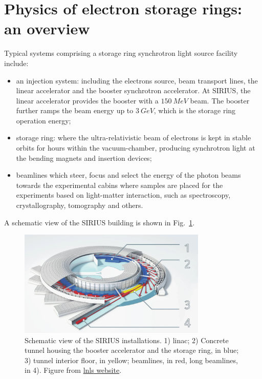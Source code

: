 \section*{Physics of electron storage rings: an overview}

Typical systems comprising a storage ring synchrotron light source facility include:
\begin{itemize}
    \item an injection system: including the electrons source, beam transport lines, the linear accelerator and the booster synchrotron accelerator. At SIRIUS, the linear accelerator provides the booster with a $150~\unit{MeV}$ beam. The booster further ramps the beam energy up to $3~\unit{GeV}$, which is the storage ring operation energy;
    \item storage ring: where the ultra-relativistic beam of electrons is kept in stable orbits for hours within the vacuum-chamber, producing synchrotron light at the bending magnets and insertion devices;
    \item beamlines which steer, focus and select the energy of the photon beams towards the experimental cabins where samples are placed for the experiments based on light-matter interaction, such as spectroscopy, crystallography, tomography and others.
\end{itemize}
A schematic view of the SIRIUS building is shown in Fig.~\ref{fig:sirius_layout}.
\begin{figure}[tb]
    \centering
    \includegraphics[width=0.8\textwidth]{Images/sirius_facility.png}
    \caption[Schematic view of the SIRIUS installations.]{Schematic view of the SIRIUS installations. 1) \gls*{linac}; 2) Concrete tunnel housing the booster accelerator and the storage ring, in blue; 3) tunnel interior floor, in yellow; beamlines, in red, long beamlines, in 4). Figure from  \href{https://lnls.cnpem.br/sirius/como-funciona-o-sirius/}{\gls*{lnls} website}.}
    \label{fig:sirius_layout}
\end{figure}

